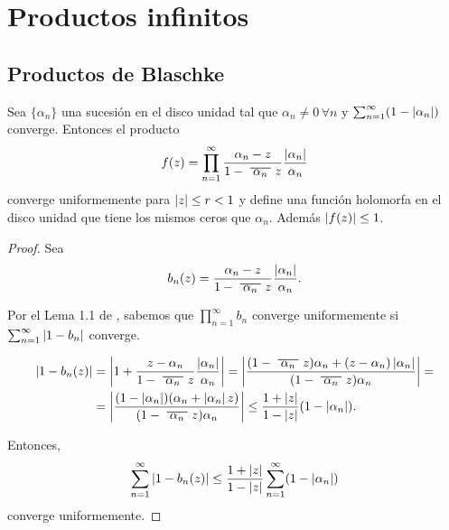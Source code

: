 \chapter{Productos infinitos}


\section{Productos de Blaschke}

\begin{prop}
    Sea $\{\alpha_n\}$ una sucesión en el disco unidad tal que $\alpha_n \not = 0 \, \forall n$ y $\sum_{n=1}^{\infty} (1 - \left\lvert\alpha_n\right\rvert)$ converge. Entonces el producto
    \begin{equation*}
        f(z) = \prod_{n=1}^{\infty} \frac{\alpha_n - z}{1 - \xbar{\alpha_n}z} \dfrac{\abs{\alpha_n}}{\alpha_n}
    \end{equation*}
    converge uniformemente para $\left\lvert z\right\rvert \leq r < 1$ y define una función holomorfa en el disco unidad que tiene los mismos ceros que $\alpha_n$. Además $\left\lvert f(z)\right\rvert \leq 1$.
\end{prop}

\begin{proof}
    Sea
    \begin{equation*}
        b_n (z) = \frac{\alpha_n - z}{1 - \xbar{\alpha_n}z} \dfrac{\abs{\alpha_n}}{\alpha_n}.
    \end{equation*}

    Por el Lema 1.1 de \citet[chap. 13]{lang}, sabemos que $\prod_{n=1}^{\infty} b_n$ converge uniformemente si $\sum_{n=1}^{\infty} \left\lvert1 - b_n\right\rvert$ converge.

    \begin{equation*}
        \begin{split}
            \abs{1 - b_n(z)} & = \abs{1 + \dfrac{z - \alpha_n}{1 - \xbar{\alpha_n}z} \dfrac{\abs{\alpha_n}}{\alpha_n}} = \abs{\dfrac{(1 - \xbar{\alpha_n}z) \alpha_n + (z - \alpha_n) \abs{\alpha_n}}{(1 - \xbar{\alpha_n}z) \alpha_n}} = \\
                             & = \abs{ \dfrac{(1 - \abs{\alpha_n}) (\alpha_n + \abs{\alpha_n} z)}{(1 - \xbar{\alpha_n}z) \alpha_n}} \leq \dfrac{1 + \abs{z}}{1 - \abs{z}} (1 - \abs{\alpha_n}).
        \end{split}
    \end{equation*}

    Entonces,
    \begin{equation*}
        \sum_{n=1}^{\infty} \abs{1 - b_n(z)} \leq \dfrac{1 + \abs{z}}{1 - \abs{z}} \sum_{n=1}^{\infty} (1 - \abs{\alpha_n}) %
    \end{equation*}
    converge uniformemente.
\end{proof}
